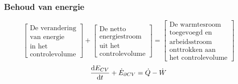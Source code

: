 \documentclass[t]{beamer}
\begin{document}
  		\begin{frame}
			\frametitle{Behoud van energie}
			\vspace{0.5cm}
			\begin{equation*}
				\left[
					\begin{array}{c}
						\mbox{De verandering} \\ \mbox{van energie} \\ \mbox{in het} \\ \mbox{controlevolume}
					\end{array}
				\right]
				+
				\left[
					\begin{array}{c}
						\mbox{De netto} \\ \mbox{energiestroom} \\ \mbox{uit het} \\ \mbox{controlevolume}
					\end{array}
				\right]
				=
				\left[
					\begin{array}{c}
						\mbox{De warmtesroom} \\ \mbox{toegevoegd en} \\   \mbox{arbeidsstroom} \\ \mbox{onttrokken aan } \\ \mbox{het controlevolume}
					\end{array}
				\right]
				\label{eqn:controlevolume,behoud van energie,woorden}
			\end{equation*}
			\vspace{1cm}
			\pause
			\begin{equation}
				\frac{\mathrm{d} E_{CV}}{\mathrm{d} t} + \dot{E}_{\partial CV} =  \dot{Q}-\dot{W}
				\label{eqn:controlevolume,behoud van energie}
			\end{equation}
		\end{frame}	
\end{document}
